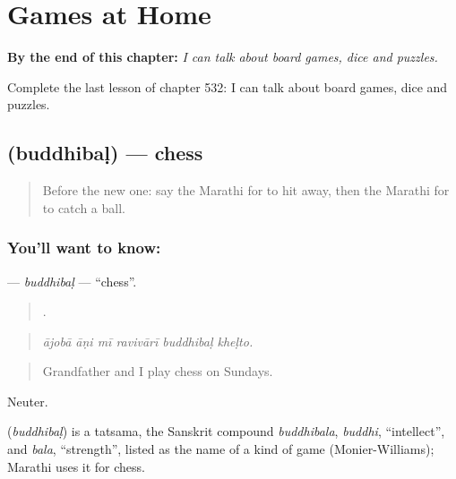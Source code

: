 
\chapter{Games at Home}
\label{ch:mr-games-at-home}

\begin{chapteropening}
\textbf{By the end of this chapter:} \emph{I can talk about board games, dice and puzzles.}

Complete the last lesson of chapter 532: I can talk about board games, dice and puzzles.
\end{chapteropening}

\section[\texorpdfstring{\mr{बुद्धिबळ} (buddhibaḷ)}{बुद्धिबळ (buddhibaḷ)}]{ (buddhibaḷ) — chess}

\label{lesson:MR-C532-buddhibal}



\begin{quote}
Before the new one: say the Marathi for to hit away, then the Marathi for to catch a ball.
\end{quote}

\subsection*{You'll want to know: }
\textbf{} — \emph{buddhibaḷ} — \textquotedblleft{}chess\textquotedblright{}.

\begin{quote}
     .
\end{quote}

\begin{quote}
\emph{ājobā āṇi mī ravivārī buddhibaḷ kheḷto.}
\end{quote}

\begin{quote}
Grandfather and I play chess on Sundays.
\end{quote}

Neuter.

\begin{cousinweb}
\textbf{} (\emph{buddhibaḷ}) is a tatsama, the Sanskrit compound \emph{buddhibala}, \emph{buddhi}, \textquotedblleft{}intellect\textquotedblright{}, and \emph{bala}, \textquotedblleft{}strength\textquotedblright{}, listed as the name of a kind of game (Monier-Williams); Marathi uses it for chess.
\end{cousinweb}

